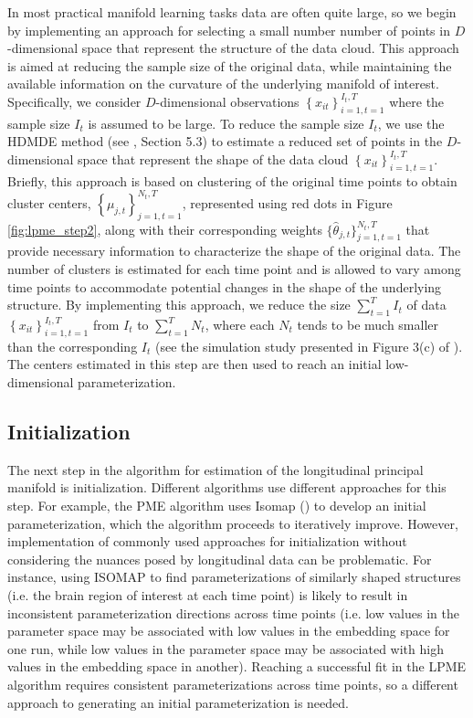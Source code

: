 \documentclass[11pt,reqno]{article}
\theoremstyle{definition}
\begin{document}
In most practical manifold learning tasks data are often quite large, so we begin by implementing an approach for selecting a small number number of points in $D$-dimensional space that represent the structure of the data cloud. This approach is aimed at reducing the sample size of the original data, while maintaining the available information on the curvature of the underlying manifold of interest. Specifically, we consider $D$-dimensional observations $\left\{x_{it}\right\}_{i=1, t=1}^{I_t, T}$ where the sample size $I_t$ is assumed to be large. To reduce the sample size $I_t$, we use the HDMDE method (see \cite{mengPrincipalManifoldEstimation2021}, Section 5.3) to estimate a reduced set of points in the $D$-dimensional space that represent the shape of the data cloud $\left\{x_{it}\right\}_{i=1, t=1}^{I_t, T}$. Briefly, this approach is based on clustering of the original time points to obtain cluster centers, $\left\{\mu_{j, t}\right\}_{j=1, t=1}^{N_t, T}$, represented using red dots in Figure \ref{fig:lpme_step2}, along with their corresponding weights $\{\hat{\theta}_{j, t}\}_{j=1, t=1}^{N_t, T}$ that provide necessary information to characterize the shape of the original data. The number of clusters is estimated for each time point and is allowed to vary among time points to accommodate potential changes in the shape of the underlying structure. By implementing this approach, we reduce the size $\sum_{t=1}^T I_t$ of data $\left\{x_{it}\right\}_{i=1, t=1}^{I_t, T}$ from $I_t$ to $\sum_{t=1}^T N_t$, where each $N_t$ tends to be much smaller than the corresponding $I_t$ (see the simulation study presented in Figure 3(c) of \cite{mengPrincipalManifoldEstimation2021}). The centers estimated in this step are then used to reach an initial low-dimensional parameterization.

\subsection*{Initialization}

The next step in the algorithm for estimation of the longitudinal principal manifold is initialization. Different algorithms use different approaches for this step. For example, the PME algorithm uses Isomap (\cite{tenenbaumGlobalGeometricFramework2000}) to develop an initial parameterization, which the algorithm proceeds to iteratively improve. However, implementation of commonly used approaches for initialization without considering the nuances posed by longitudinal data can be problematic. For instance, using ISOMAP to find parameterizations of similarly shaped structures (i.e. the brain region of interest at each time point) is likely to result in inconsistent parameterization directions across time points (i.e. low values in the parameter space may be associated with low values in the embedding space for one run, while low values in the parameter space may be associated with high values in the embedding space in another). Reaching a successful fit in the LPME algorithm requires consistent parameterizations across time points, so a different approach to generating an initial parameterization is needed.
\end{document}
